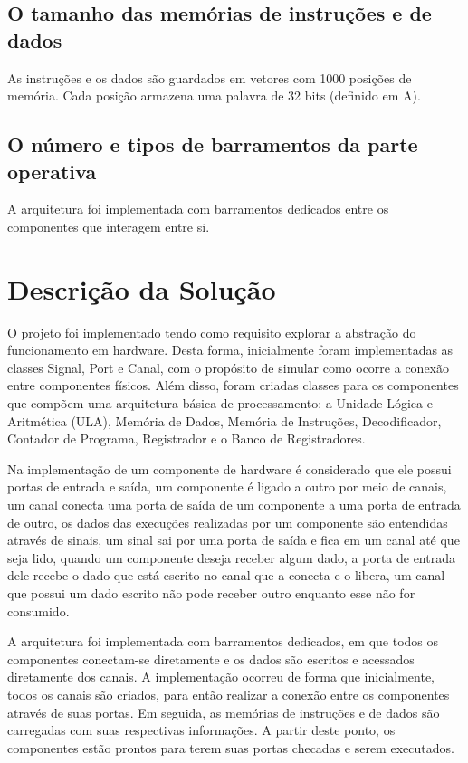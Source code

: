 \documentclass[12pt]{article}
\begin{document}
\subsection{O tamanho das memórias de instruções e de dados}
As instruções e os dados são guardados em vetores com 1000 posições de memória. Cada posição armazena uma palavra de 32 bits (definido em A).

\subsection{O número e tipos de barramentos da parte operativa}
A arquitetura foi implementada com barramentos dedicados entre os componentes que interagem entre si.

\section{Descrição da Solução}

O projeto foi implementado tendo como requisito explorar a abstração do funcionamento em hardware. Desta forma, inicialmente foram implementadas as classes Signal, Port e Canal, com o propósito de simular como ocorre a conexão entre componentes físicos. Além disso, foram criadas classes para os componentes que compõem uma arquitetura básica de processamento: a Unidade Lógica e Aritmética (ULA), Memória de Dados, Memória de Instruções, Decodificador, Contador de Programa, Registrador e o Banco de Registradores.

    Na implementação de um componente de hardware é considerado que ele possui portas de entrada e saída, um componente é ligado a outro por meio de canais, um canal conecta uma porta de saída de um componente a uma porta de entrada de outro, os dados das execuções realizadas por um componente são entendidas através de sinais, um sinal sai por uma porta de saída e fica em um canal até que seja lido, quando um componente deseja receber algum dado, a porta de entrada dele recebe o dado que está escrito no canal que a conecta e o libera, um canal que possui um dado escrito não pode receber outro enquanto esse não for consumido. 

A arquitetura foi implementada com barramentos dedicados, em que todos os componentes conectam-se diretamente e os dados são escritos e acessados diretamente dos canais. A implementação ocorreu de forma que inicialmente, todos os canais são criados, para então realizar a conexão entre os componentes através de suas portas. Em seguida, as memórias de instruções e de dados são carregadas com suas respectivas informações. A partir deste ponto, os componentes estão prontos para terem suas portas checadas e serem executados.
\end{document}

